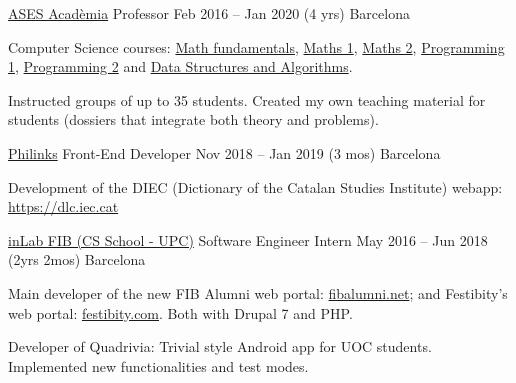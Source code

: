 \begin{cventries}
  \cventry
    {\href{https://www.asesacademia.com}{ASES Acadèmia}} %
    {Professor} %
    {Feb 2016 – Jan 2020 (4 yrs)} %
    {Barcelona} %
    {
      \begin{cvitems} %
        \item {Computer Science courses: \href{https://www.fib.upc.edu/en/studies/bachelors-degrees/bachelor-degree-informatics-engineering/curriculum/syllabus/FM}{Math fundamentals}, \href{https://www.fib.upc.edu/en/studies/bachelors-degrees/bachelor-degree-informatics-engineering/curriculum/syllabus/M1}{Maths 1}, \href{https://www.fib.upc.edu/en/studies/bachelors-degrees/bachelor-degree-informatics-engineering/curriculum/syllabus/M2}{Maths 2}, \href{https://www.fib.upc.edu/en/studies/bachelors-degrees/bachelor-degree-informatics-engineering/curriculum/syllabus/PRO1}{Programming 1}, \href{https://www.fib.upc.edu/en/studies/bachelors-degrees/bachelor-degree-informatics-engineering/curriculum/syllabus/PRO2}{Programming 2} and \href{https://www.fib.upc.edu/en/studies/bachelors-degrees/bachelor-degree-informatics-engineering/curriculum/syllabus/EDA}{Data Structures and Algorithms}.}
        \item {Instructed groups of up to 35 students. Created my own teaching material for students (dossiers that integrate both theory and problems).}
      \end{cvitems}
    }

  \cventry
    {\href{https://philinks.com}{Philinks}} %
    {Front-End Developer} %
    {Nov 2018 – Jan 2019 (3 mos)} %
    {Barcelona} %
    {
      \begin{cvitems} %
        \item {Development of the DIEC (Dictionary of the Catalan Studies Institute)  webapp: \url{https://dlc.iec.cat}}
      \end{cvitems}
    }

  \cventry
    {\href{https://inlab.fib.upc.edu/ca}{inLab FIB (CS School - UPC)}} %
    {Software Engineer Intern} %
    {May 2016 – Jun 2018 (2yrs 2mos)} %
    {Barcelona} %
    {
      \begin{cvitems} %
        \item {Main developer of the new FIB Alumni web portal: \url{fibalumni.net}; and Festibity’s web portal: \url{festibity.com}. Both with Drupal 7 and PHP.}
        \item {Developer of Quadrivia: Trivial style Android app for UOC students. Implemented new functionalities and test modes.}
      \end{cvitems}
    }

\end{cventries}
